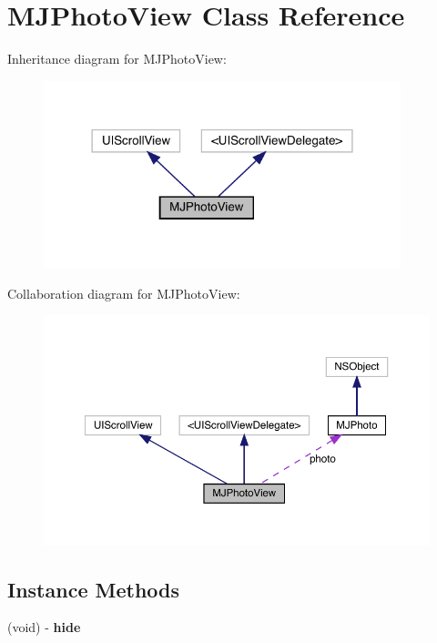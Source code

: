 \hypertarget{interface_m_j_photo_view}{}\section{M\+J\+Photo\+View Class Reference}
\label{interface_m_j_photo_view}


Inheritance diagram for M\+J\+Photo\+View\+:\nopagebreak
\begin{figure}[H]
\begin{center}
\leavevmode
\includegraphics[width=294pt]{interface_m_j_photo_view__inherit__graph}
\end{center}
\end{figure}


Collaboration diagram for M\+J\+Photo\+View\+:\nopagebreak
\begin{figure}[H]
\begin{center}
\leavevmode
\includegraphics[width=350pt]{interface_m_j_photo_view__coll__graph}
\end{center}
\end{figure}
\subsection*{Instance Methods}
\begin{DoxyCompactItemize}
\item 
\mbox{\label{interface_m_j_photo_view_aa149efcd1efed8617208ead775d7e638}} 
(void) -\/ {\bfseries hide}
\end{DoxyCompactItemize}
